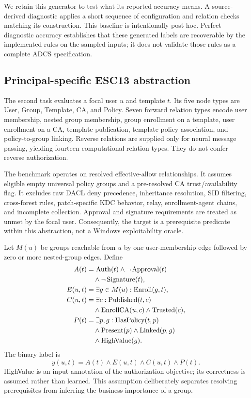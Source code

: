 \documentclass[journal]{IEEEtran}
\begin{document}
We retain this generator to test what its reported accuracy means. A source-derived diagnostic applies a short sequence of configuration and relation checks matching its construction. This baseline is intentionally post hoc. Perfect diagnostic accuracy establishes that these generated labels are recoverable by the implemented rules on the sampled inputs; it does not validate those rules as a complete ADCS specification.

\subsection{Principal-specific ESC13 abstraction}
The second task evaluates a focal user $u$ and template $t$. Its five node types are User, Group, Template, CA, and Policy. Seven forward relation types encode user membership, nested group membership, group enrollment on a template, user enrollment on a CA, template publication, template policy association, and policy-to-group linking. Reverse relations are supplied only for neural message passing, yielding fourteen computational relation types. They do not confer reverse authorization.

The benchmark operates on resolved effective-allow relationships. It assumes eligible empty universal policy groups and a pre-resolved CA trust/availability flag. It excludes raw DACL deny precedence, inheritance resolution, SID filtering, cross-forest rules, patch-specific KDC behavior, relay, enrollment-agent chains, and incomplete collection. Approval and signature requirements are treated as unmet by the focal user. Consequently, the target is a prerequisite predicate within this abstraction, not a Windows exploitability oracle.

Let $M(u)$ be groups reachable from $u$ by one user-membership edge followed by zero or more nested-group edges. Define
\begin{align}
 A(t)&=\operatorname{Auth}(t)\land\neg\operatorname{Approval}(t)\notag\\
     &\quad\land\neg\operatorname{Signature}(t),\\
 E(u,t)&=\exists g\in M(u):\operatorname{Enroll}(g,t),\\
 C(u,t)&=\exists c:\operatorname{Published}(t,c)\notag\\
     &\quad\land\operatorname{EnrollCA}(u,c)\land\operatorname{Trusted}(c),\\
 P(t)&=\exists p,g:\operatorname{HasPolicy}(t,p)\notag\\
     &\quad\land\operatorname{Present}(p)\land\operatorname{Linked}(p,g)\notag\\
     &\quad\land\operatorname{HighValue}(g).
\end{align}
The binary label is
\begin{equation}
 y(u,t)=A(t)\land E(u,t)\land C(u,t)\land P(t).
 \label{eq:predicate}
\end{equation}
HighValue is an input annotation of the authorization objective; its correctness is assumed rather than learned. This assumption deliberately separates resolving prerequisites from inferring the business importance of a group.
\end{document}
